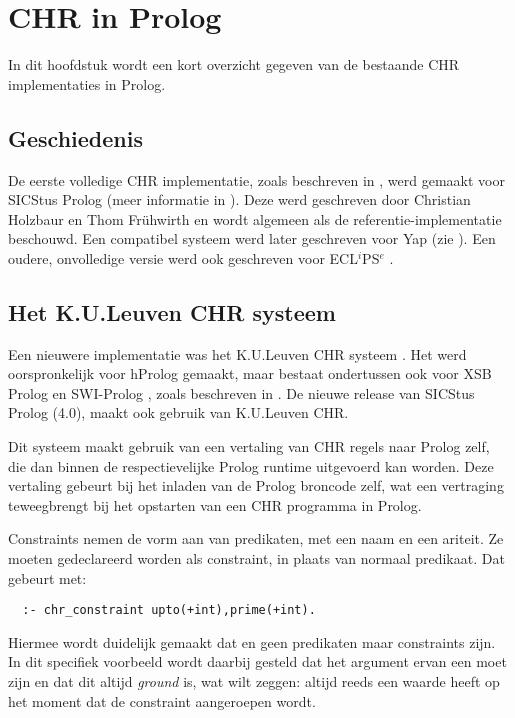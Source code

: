 \chapter{CHR in Prolog} \label{chap:chrprolog}

In dit hoofdstuk wordt een kort overzicht gegeven van de bestaande CHR implementaties in Prolog.

\section{Geschiedenis}

De eerste volledige CHR implementatie, zoals beschreven in \cite{christian:system}, werd gemaakt voor SICStus Prolog (meer informatie in \cite{sicstus}). Deze werd geschreven door Christian Holzbaur en Thom Fr\"uhwirth en wordt algemeen als de referentie-implementatie beschouwd. Een compatibel systeem werd later geschreven voor Yap (zie \cite{yap}). Een oudere, onvolledige versie werd ook geschreven voor ECL$^i$PS$^e$ \cite{eclipse}.

\section{Het K.U.Leuven CHR systeem}

Een nieuwere implementatie was het K.U.Leuven CHR systeem \cite{tom:kulchr}. Het werd oorspronkelijk voor hProlog gemaakt, maar bestaat ondertussen ook voor XSB Prolog \cite{xsb} en SWI-Prolog \cite{swiprolog}, zoals beschreven in \cite{tom:swi:wclp2005}. De nieuwe release van SICStus Prolog (4.0), maakt ook gebruik van K.U.Leuven CHR.

Dit systeem maakt gebruik van een vertaling van CHR regels naar Prolog zelf, die dan binnen de respectievelijke Prolog runtime uitgevoerd kan worden. Deze vertaling gebeurt bij het inladen van de Prolog broncode zelf, wat een vertraging teweegbrengt bij het opstarten van een CHR programma in Prolog.

Constraints nemen de vorm aan van predikaten, met een naam en een ariteit. Ze moeten gedeclareerd worden als constraint, in plaats van normaal predikaat. Dat gebeurt met: \begin{Verbatim}
  :- chr_constraint upto(+int),prime(+int).
\end{Verbatim}
Hiermee wordt duidelijk gemaakt dat  en  geen predikaten maar constraints zijn. In dit specifiek voorbeeld wordt daarbij gesteld dat het argument ervan een  moet zijn en dat dit altijd {\em ground} is, wat wilt zeggen: altijd reeds een waarde heeft op het moment dat de constraint aangeroepen wordt.

